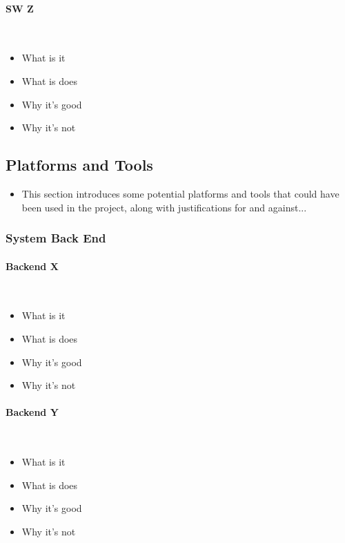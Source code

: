 \paragraph{SW Z}\ \\
{\color{red}
	\begin{itemize}
		\item What is it
		\item What is does
		\item Why it's good
		\item Why it's not
	\end{itemize}
}


\subsection{Platforms and Tools}
\label{sec:pat}

{\color{red}
	\begin{itemize}
		\item This section introduces some potential platforms and tools that could have been used in the project, along with justifications for and against...
	\end{itemize}
}

\subsubsection{System Back End}
\paragraph{Backend X}\ \\
{\color{red}
	\begin{itemize}
		\item What is it
		\item What is does
		\item Why it's good
		\item Why it's not
	\end{itemize}
}
\paragraph{Backend Y}\ \\
{\color{red}
	\begin{itemize}
		\item What is it
		\item What is does
		\item Why it's good
		\item Why it's not
	\end{itemize}
}
